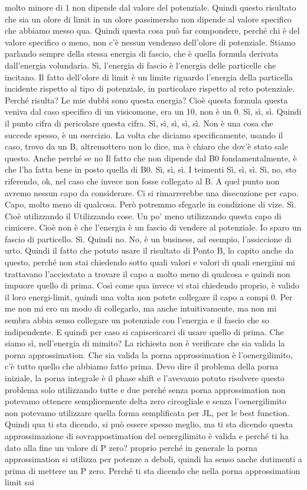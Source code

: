 \begin{soluzione}
   molto minore di 1 non dipende dal valore del potenziale. Quindi questo risultato che sia un olore di limit in un olore passimersho non dipende al valore specifico che abbiamo messo qua. Quindi questa cosa può far compondere, perché chi è del valore specifico o meno, non c'è nessun vendenso dell'olore di potenziale. Stiamo parlando sempre della stessa energia di fascio, che è quella formula derivata dall'energia volundaria. Sì, l'energia di fascio è l'energia delle particelle che incitano. Il fatto dell'olore di limit è un limite riguardo l'energia della particella incidente rispetto al tipo di potenziale, in particolare rispetto al reto potenziale. Perché risulta? Le mie dubbi sono questa energia? Cioè questa formula questa veniva dal caso specifico di un visicomone, era un 10, non è un 0. Sì, sì, sì. Quindi il punto cifra di pericolare questa cifra. Sì, sì, sì, sì, sì. Non è una cosa che succede spesso, è un esercizio. La volta che diciamo specificamente, usando il caso, trovo da un B, altremottero non lo dice, ma è chiaro che dov'è stato sale questo. Anche perché se no Il fatto che non dipende dal B0 fondamentalmente, è che l'ha fatta bene in posto quella di B0. Sì, sì, sì. I teimenti Sì, sì, sì. Sì, no, sto riferendo, ok, nel caso che invece non fosse collegato al B. A quel punto non avremo nessun capo da considerare. Ci si rimarrerebbe una disecuzione per capo. Capo, molto meno di qualcosa. Però potremmo sfegarle in condizione di vize. Sì. Cioè utilizzando il Utilizzando cose. Un po' meno utilizzando questa capo di cimicere. Cioè non è che l'energia è un fascio di vendere al potenziale. Io sparo un fascio di particello. Sì. Quindi no. No, è un business, ad esempio, l'assiccione di urto. Quindi il fatto che potuto usare il risultato di Ponto B, lo capito anche da questo, perché non stai chiedendo sotto quali valori e valori di quali energiini mi trattavano l'acciestato a trovare il capo a molto meno di qualcosa e quindi non impuore quello di prima. Così come qua invece vi stai chiedendo proprio, è valido il loro energi-limit, quindi una volta non potete collegare il capo a compi 0. Per me non mi ero un modo di collegarlo, ma anche intuitivamente, ma non mi sembra abbia senso collegare un potenziale con l'energia e il fascio che so indipendente. E quindi per caso si capisceicarci di usare quello di prima. Che siamo sì, nell'energia di mimito? La richiesta non è verificare che sia valida la porna approssimation. Che sia valida la porna approssimation è l'oenergilimito, c'è tutto quello che abbiamo fatto prima. Devo dire il problema della porna iniziale, la porna integrale è il phase shift e l'avevamo potuto risolvere questo problema solo utilizzando tutte e due perché senza porna approssimation non potevamo ottenere semplicemente delta zero circogliale e senza l'oenergilimito non potevamo utilizzare quella forma semplificata per JL, per le best function. Quindi qua ti sta dicendo, si può essere spesso meglio, ma ti sta dicendo questa approssimazione di sovrappostimation del oenergilimito è valida e perché ti ha dato alla fine un valore di P zero? proprio perché in generale la porna approssimation si utilizza per potenze a deboli, quindi ha senso anche dutimenti a prima di mettere un P zero. Perché ti sta dicendo che nella porna approssimation limit sai 
\end{soluzione}
